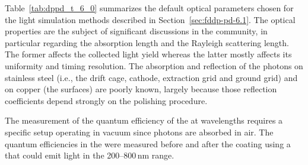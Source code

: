 Table~\ref{tab:dppd_t_6_0} summarizes the default optical parameters chosen for the light simulation methods described in Section~\ref{sec:fddp-pd-6.1}. The \lar optical properties are the subject of significant discussions in the community, in particular regarding the \lar absorption length and the Rayleigh scattering length. The former affects the collected light yield  whereas the latter mostly affects its uniformity and timing resolution. The absorption and reflection of the  photons on stainless steel (i.e., the drift cage, cathode, extraction grid and ground grid) and on copper (the  surfaces) are poorly known, 
largely because those reflection coefficients depend strongly on the polishing procedure. 

The measurement of the quantum efficiency of the  at  wavelengths requires a specific setup operating in vacuum since  photons are absorbed in air. The  quantum efficiencies in the   were measured before and after the  coating using a   that could emit light in the \numrange{200}{800}\,{nm} range. 

